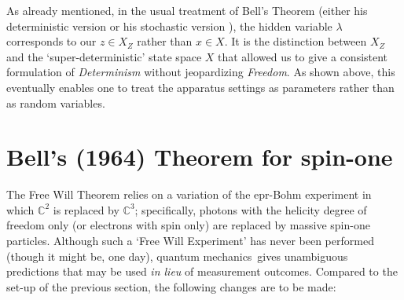 \documentclass[12pt]{article}
\newcommand{\epr}{{\sc epr}}
\newcommand{\qm}{quantum mechanics}
\newcommand{\lm}{\lambda} \newcommand{\Lm}{\Lambda}
\newcommand{\C}{{\mathbb C}} \newcommand{\D}{{\mathbb D}}
\begin{document}
As already mentioned, in the usual treatment of Bell's Theorem (either his deterministic version \cite{Bell1,Bub} or his  stochastic version \cite{Bell4,Bub,JB,Gill,Jaeger,Maudlin,Seevinck,WW}), the hidden variable $\lm$ corresponds to  our
 $z\in X_Z$ rather than $x\in X$. It is the distinction  between $X_Z$ and the `super-deterministic' state space $X$ that allowed us to give a consistent formulation of \emph{Determinism} without jeopardizing  \emph{Freedom}. As  shown above, this eventually enables one to treat the apparatus settings as parameters rather than as random variables.

\section{Bell's (1964) Theorem for spin-one}\label{BT1sec}
The Free Will Theorem relies on a variation of the \epr-Bohm experiment in which $\C^2$ is replaced by $\C^3$; specifically,  photons with the helicity degree of freedom only (or electrons with spin only) are replaced by massive spin-one particles. Although such a `Free Will Experiment' has never been performed (though it might be, one day), \qm\ gives unambiguous predictions that may be used \emph{in lieu} of measurement outcomes. Compared to the set-up of the previous section, the following changes are to be made:
\end{document}

